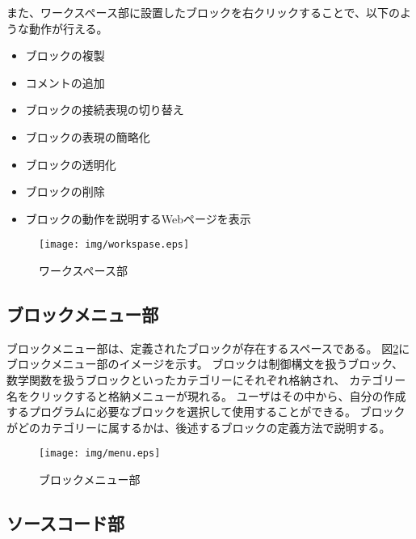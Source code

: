 \documentclass{risepaper}
\begin{document}
また、ワークスペース部に設置したブロックを右クリックすることで、以下のような動作が行える。

\begin{itemize}
\item ブロックの複製
\item コメントの追加
\item ブロックの接続表現の切り替え
\item ブロックの表現の簡略化
\item ブロックの透明化
\item ブロックの削除
\item ブロックの動作を説明するWebページを表示
\end{itemize}

\begin{figure}[h]
\begin{center}
\texttt{[image: img/workspase.eps]}
\caption{ワークスペース部}%
\label{fig:workspase}
\end{center}%
\end{figure}%

\subsection{ブロックメニュー部}

ブロックメニュー部は、定義されたブロックが存在するスペースである。
図\ref{fig:menu}にブロックメニュー部のイメージを示す。
ブロックは制御構文を扱うブロック、数学関数を扱うブロックといったカテゴリーにそれぞれ格納され、
カテゴリー名をクリックすると格納メニューが現れる。
ユーザはその中から、自分の作成するプログラムに必要なブロックを選択して使用することができる。
ブロックがどのカテゴリーに属するかは、後述するブロックの定義方法で説明する。

\newpage

\begin{figure}[h]
\begin{center}
\texttt{[image: img/menu.eps]}
\caption{ブロックメニュー部}%
\label{fig:menu}
\end{center}%
\end{figure}%

\subsection{ソースコード部}
\end{document}
